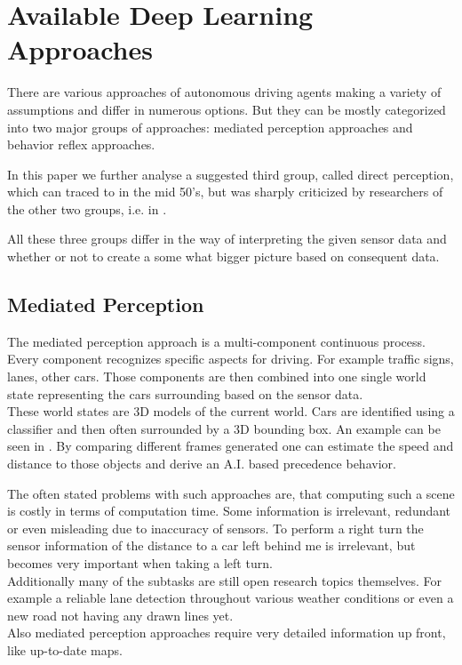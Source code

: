\section{Available Deep Learning Approaches}\label{sec: Deep Learning Approaches}

There are various approaches of autonomous driving agents making a variety of assumptions and differ in numerous options. But they can be mostly categorized into two major groups of approaches: mediated perception approaches and behavior reflex approaches. \cite{chen2015deepdriving}

In this paper we further analyse a suggested third group, called direct perception, which can traced to \cite{gibson1979ecological} in the mid 50's, but was sharply criticized by researchers of the other two groups, i.e. in \cite{ullman1980against}. %

All these three groups differ in the way of interpreting the given sensor data and whether or not to create a some what bigger picture based on consequent data.

\subsection{Mediated Perception} \label{subsec: Mediated Perception}

The mediated perception approach is a multi-component continuous process. Every component recognizes specific aspects for driving. For example traffic signs, lanes, other cars. Those components are then combined into one single world state representing the cars surrounding based on the sensor data. \cite{KITTI}\\
These world states are 3D models of the current world. Cars are identified using a classifier and then often surrounded by a 3D bounding box. An example can be seen in . By comparing different frames generated one can estimate the speed and distance to those objects and derive an A.I. based precedence behavior. \cite{KITTI}\cite{chen2015deepdriving}

The often stated problems with such approaches are, that computing such a scene is costly in terms of computation time. Some information is irrelevant, redundant or even misleading due to inaccuracy of sensors. To perform a right turn the sensor information of the distance to a car left behind me is irrelevant, but becomes very important when taking a left turn.\\
Additionally many of the subtasks are still open research topics themselves. For example a reliable lane detection throughout various weather conditions or even a new road not having any drawn lines yet. \cite{aly2008real}\\
Also mediated perception approaches require very detailed information up front, like up-to-date maps.

